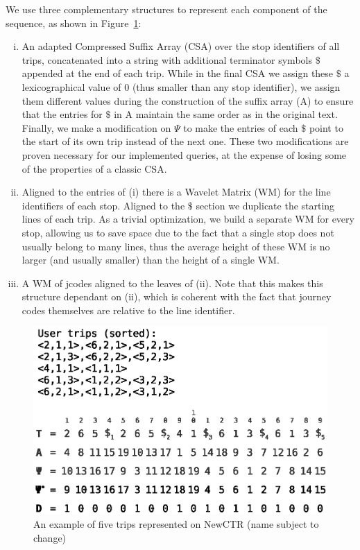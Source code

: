 \documentclass[runningheads]{llncs}
\newcommand{\ctr}{NewCTR (name subject to change)\ }
\begin{document}
We use three complementary structures to represent each component of the sequence, as shown in Figure~\ref{fig:example_ctr}:
\begin{enumerate}[(i)]
    \item An adapted Compressed Suffix Array (CSA) over the stop identifiers of all trips, concatenated into a string with additional terminator symbols $\$$ appended at the end of each trip. While in the final CSA we assign these $\$$ a lexicographical value of 0 (thus smaller than any stop identifier), we assign them different values during the construction of the suffix array (A) to ensure that the entries for $\$$ in A maintain the same order as in the original text. Finally, we make a modification on $\Psi$ to make the entries of each $\$$ point to the start of its own trip instead of the next one. These two modifications are proven necessary for our implemented queries, at the expense of losing some of the properties of a classic CSA.
    \item Aligned to the entries of (i) there is a Wavelet Matrix (WM) for the line identifiers of each stop. Aligned to the $\$$ section we duplicate the starting lines of each trip. As a trivial optimization, we build a separate WM for every stop, allowing us to save space due to the fact that a single stop does not usually belong to many lines, thus the average height of these WM is no larger (and usually smaller) than the height of a single WM.
    \item A WM of jcodes aligned to the leaves of (ii). Note that this makes this structure dependant on (ii), which is coherent with the fact that journey codes themselves are relative to the line identifier.
\end{enumerate}

\begin{figure}
\includegraphics[width=\textwidth]{example_trips.eps}
\caption{An example of five trips represented on \ctr}
\label{fig:example_ctr}
\end{figure}
\end{document}
